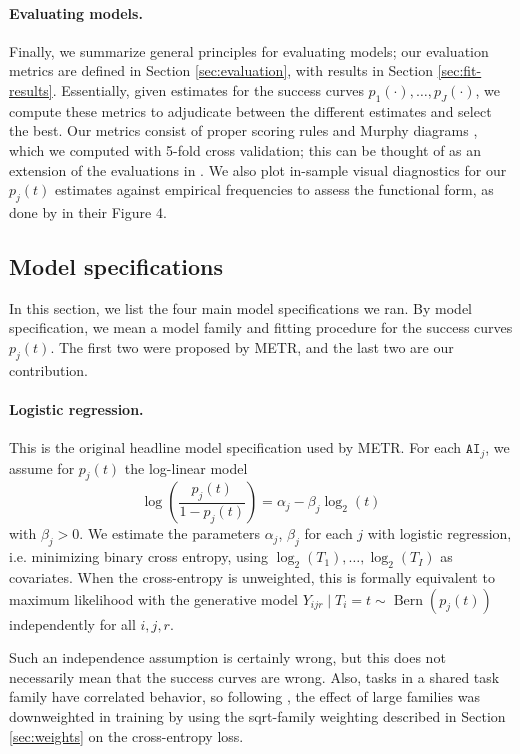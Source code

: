 \documentclass{article}
\theoremstyle{definition}
\newcommand{\AI}{\texttt{AI}}
\begin{document}
\paragraph{Evaluating models.} Finally, we summarize general principles for evaluating models; our evaluation metrics are defined in Section \ref{sec:evaluation}, with results in Section \ref{sec:fit-results}. Essentially, given estimates for the success curves $p_1(\cdot), \dots, p_J(\cdot)$, we compute these metrics to adjudicate between the different estimates and select the best. Our metrics consist of proper scoring rules and Murphy diagrams \citep{dimitriadisEvaluatingProbabilisticClassifiers2023}, which we computed with 5-fold cross validation; this can be thought of as an extension of the evaluations in \citet{ImpactModellingAssumptions2026}. We also plot in-sample visual diagnostics for our $p_j(t)$ estimates against empirical frequencies to assess the functional form, as done by \citet{kwaMeasuringAIAbility2026} in their Figure 4. 

\subsection{Model specifications} \label{sec:modelspecs}

In this section, we list the four main model specifications we ran. By model specification, we mean a model family and fitting procedure for the success curves $p_j(t)$. The first two were proposed by METR, and the last two are our contribution. 

\paragraph{Logistic regression.} This is the original headline model specification used by METR. For each $\AI_j$, we assume for $p_j(t)$ the log-linear model
\[
    \log\left(
      \frac{p_j(t)}{1-p_j(t)}
    \right)  = \alpha_j - \beta_j \log_2(t)
\]
with $\beta_j > 0$. We estimate the parameters $\alpha_j$, $\beta_j$ for each $j$ with logistic regression, i.e. minimizing binary cross entropy, using $\log_2(T_1), \dots,\log_2(T_I)$ as covariates. When the cross-entropy is unweighted, this is formally equivalent to maximum likelihood with the generative model $Y_{ijr} \mid T_i = t \sim \operatorname{Bern}(p_j(t))$ independently for all $i, j, r$. 

Such an independence assumption is certainly wrong, but this does not necessarily mean that the success curves are wrong. Also, tasks in a shared task family have correlated behavior, so following \citet{kwaMeasuringAIAbility2025a}, the effect of large families was downweighted in training by using the sqrt-family weighting described in Section \ref{sec:weights} on the cross-entropy loss.
\end{document}
